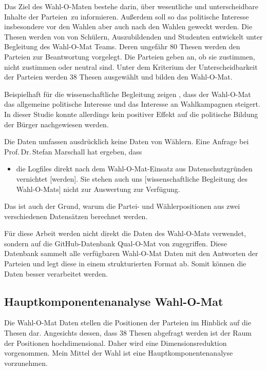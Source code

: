 Das Ziel des Wahl-O-Maten bestehe darin, über \glqq wesentliche und unterscheidbare Inhalte der Parteien\grqq\ zu informieren. Außerdem soll so das politische Interesse insbesondere vor den Wahlen aber auch nach den Wahlen geweckt werden. 
Die Thesen werden von von Schülern, Auszubildenden und Studenten entwickelt unter Begleitung des Wahl-O-Mat Teams. Deren ungefähr 80 Thesen werden den Parteien zur Beantwortung vorgelegt. Die Parteien geben an, ob sie zustimmen, nicht zustimmen oder neutral sind. Unter dem Kriterium der Unterscheidbarkeit der Parteien werden  38 Thesen ausgewählt und bilden den Wahl-O-Mat.
\citep{marschall2022wahlomatFAQ}%

Beispielhaft für die wissenschaftliche Begleitung zeigen \citet{heinsohn2019effects}, dass der Wahl-O-Mat das allgemeine politische Interesse und das Interesse an Wahlkampagnen steigert. In dieser Studie konnte allerdings kein positiver Effekt auf die politische Bildung der Bürger nachgewiesen werden. \citep[S.\,257-258]{heinsohn2019effects}

Die Daten umfassen ausdrücklich keine Daten von Wählern. Eine Anfrage bei Prof.\,Dr.\,Stefan Marschall hat ergeben, dass
\begin{itemize}
	\item[] \glqq die Logfiles direkt nach dem Wahl-O-Mat-Einsatz aus Datenschutzgründen vernichtet [werden]. Sie stehen auch uns [wissenschaftliche Begleitung des Wahl-O-Mats] nicht zur Auswertung zur Verfügung.\grqq
\end{itemize}
Das ist auch der Grund, warum die Partei- und Wählerpositionen aus zwei verschiedenen Datensätzen berechnet werden.

Für diese Arbeit werden nicht direkt die Daten des Wahl-O-Mats verwendet, sondern auf die GitHub-Datenbank Qual-O-Mat von \citet{Bolte2022QualOMat} zugegriffen. Diese Datenbank sammelt alle verfügbaren Wahl-O-Mat Daten mit den Antworten der Parteien und legt diese in einem strukturierten Format ab.
Somit können die Daten besser verarbeitet werden.

\subsection{Hauptkomponentenanalyse Wahl-O-Mat}\label{sec:Hauptkomponentenanalyse}

Die Wahl-O-Mat Daten stellen die Positionen der Parteien im Hinblick auf die Thesen dar. Angesichts dessen, dass 38 Thesen abgefragt werden ist der Raum der Positionen hochdimensional. Daher wird eine Dimensionsreduktion vorgenommen. Mein Mittel der Wahl ist eine Hauptkomponentenanalyse vorzunehmen.

